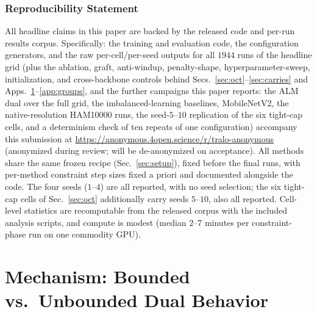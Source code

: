 \documentclass[10pt]{article}
\begin{document}
\subsubsection*{Reproducibility Statement}
All headline claims in this paper are backed by the released code and
per-run results corpus. Specifically: the training and evaluation code,
the configuration generators, and the raw per-cell/per-seed outputs for
all $1944$ runs of the headline grid (plus the ablation, graft,
anti-windup, penalty-shape, hyperparameter-sweep, initialization, and
cross-backbone controls behind
Secs.~\ref{sec:oct}--\ref{sec:carries} and Apps.~\ref{app:mech}--\ref{app:groups}{,
and the further campaigns this paper reports: the ALM dual over the full grid, the
imbalanced-learning baselines, MobileNetV2, the native-resolution
HAM10000 runs, the seed-$5$--$10$ replication of the six tight-cap cells, and a
determinism check of ten repeats of one configuration})
accompany this submission at
\url{https://anonymous.4open.science/r/tralo-anonymous}
(anonymized during review; will be de-anonymized on acceptance). All
methods share the same frozen recipe (Sec.~\ref{sec:setup}), fixed before
the final runs, with per-method constraint step sizes fixed a priori and
documented alongside the code. The four seeds
($1$--$4$) are all reported, with no seed selection{; the six
tight-cap cells of Sec.~\ref{sec:oct} additionally carry seeds $5$--$10$, also
all reported}. Cell-level statistics are recomputable from the released
corpus with the included analysis scripts, and compute is modest
(median $2$--$7$ minutes per constraint-phase run on one commodity GPU).




\appendix

\section{Mechanism: Bounded vs.\ Unbounded Dual Behavior}
\label{app:mech}
\end{document}
